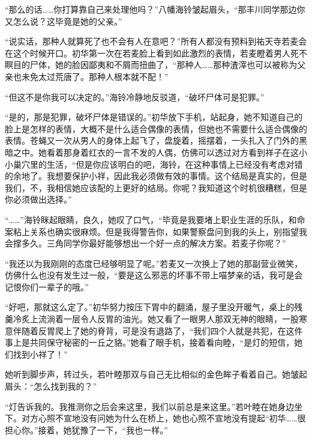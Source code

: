 \documentclass{article}
\begin{document}
“那么的话……你打算靠自己来处理他吗？”八幡海铃皱起眉头，“那丰川同学那边你又怎么说？这毕竟是她的父亲。”



“说实话，那种人就算死了也不会有人在意吧？”所有人都没有预料到祐天寺若麦会在这个时候开口。初华第一次在若麦脸上看到如此激烈的表情，若麦瞪着男人死不瞑目的尸体，她的脸因鄙夷和不屑而扭曲了，“那种人……那种渣滓也可以被称为父亲也未免太过荒唐了。那种人根本就不配！”



“但这不是你我可以决定的。”海铃冷静地反驳道，“破坏尸体可是犯罪。”



“是的，那是犯罪，破坏尸体是错误的。”初华放下手机，站起身，她不知道自己的脸上是怎样的表情，大概不是什么适合偶像的表情，但她也不需要什么适合偶像的表情。苍蝇又一次从男人的身体上起飞了，盘旋着，摇摆着，一头扎入了门外的黑暗之中。她看着那身着红衣的一言不发的人偶，仿佛可以透过对方看到祥子在这小小巢穴里的生活，“但是你应该明白的吧，海铃，在这种事情上已经没有考虑对错的余地了。我想要保护小祥，因此我必须做有效的事情。这个结局是真实的，但是我们，不，我相信她应该配的上更好的结局。你呢？我知道这个时机很糟糕，但是你必须做出选择。”



“……”海铃眯起眼睛，良久，她叹了口气，“毕竟是我要堵上职业生涯的乐队，和命案粘上关系也确实很麻烦。但是我得警告你，如果警察盘问到我的头上，别指望我会撑多久。三角同学你最好能够想出一个好一点的解决方案。若麦子你呢？”



“我还以为我刚刚的态度已经够明显了呢。”若麦又一次换上了她的那副营业微笑，仿佛什么也没有发生过一般，“要是这么邪恶的坏事不带上喵梦亲的话，我可是会记恨你们一辈子的哦。”



“好吧，那就这么定了。”初华努力按压下胃中的翻涌，屋子里没开暖气，桌上的残羹冷炙上流淌着一层令人反胃的油光。她又看了一眼男人那双无神的眼睛，一股寒意伴随着反胃爬上了她的脊背，可是没有退路了，“我们四个人就是共犯，在这件事上是共同保守秘密的一丘之貉。”她看了眼手机，接着看向睦，“是灯的短信，她们找到小祥了！”



\newpage



她听到脚步声，转过头，若叶睦那双与自己无比相似的金色眸子看着自己。她皱起眉头：“怎么找到我的？”



“灯告诉我的。我推测你之后会来这里，我们以前总是来这里。”若叶睦在她身边坐下。对方心照不宣地没有问她为什么在桥上，她也心照不宣地没有提起“初华……很担心你。”接着，她犹豫了一下，“我也一样。”
\end{document}
